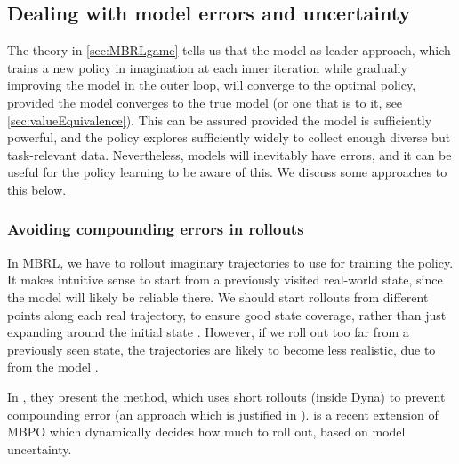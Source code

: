 \subsection{Dealing with model errors and uncertainty}
\label{sec:uncertainty}
\label{sec:modelUncertainty}

The theory in \cref{sec:MBRLgame} tells us that the model-as-leader
approach, which trains a new policy in imagination at each inner iteration 
while gradually improving the model in the outer loop,
will converge to the optimal policy,
provided the model converges to the true model (or one that is
 to it, see \cref{sec:valueEquivalence}).
This can be assured provided the model is sufficiently powerful,
and the policy explores sufficiently widely to collect
enough diverse but task-relevant data.
Nevertheless, models will inevitably have errors, and it can be useful
for the policy learning to be aware of this.
We discuss some approaches to this below.


\subsubsection{Avoiding compounding errors  in rollouts}

In MBRL,
we have to rollout imaginary trajectories to use for training
the policy.
It makes intuitive sense to 
start from a previously visited real-world state,
since the model will likely be reliable there.
We should start rollouts from different points along each real trajectory,
to ensure good state coverage,
rather than just expanding around the initial state \citep{Rajeswaran2017}.
However, if we roll out too far from a previously seen state, the trajectories
are likely to become less realistic,
due to  from the model
\citep{Lambert2022}.

In \citep{Janner2019}, they present the
 method,
which  uses short rollouts (inside Dyna) to prevent compounding error
(an approach which is justified in \citep{Jiang2015}).
\citep{Frauenknecht2024} is a recent extension of MBPO which
dynamically decides how much to roll out, based on model uncertainty.


